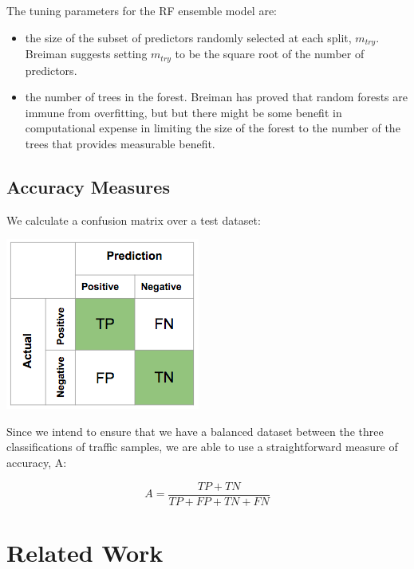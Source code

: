 \documentclass[conference]{IEEEtran}
\let\citep\cite
\let\tightlist\relax %
\begin{document}
The tuning parameters for the RF ensemble model are:

\begin{itemize}
\tightlist
\item
  the size of the subset of predictors randomly selected at each split,
  \(m_{try}\). Breiman suggests \citep{Breiman2001} setting \(m_{try}\)
  to be the square root of the number of predictors.
\item
  the number of trees in the forest. Breiman has proved that random
  forests are immune from overfitting, but but there might be some
  benefit in computational expense in limiting the size of the forest to
  the number of the trees that provides measurable benefit.
\end{itemize}

\subsection{Accuracy Measures}\label{sec:accuracy-measures}

\label{sec:accuracy}

We calculate a confusion matrix over a test dataset:

\begin{center}\includegraphics[width=0.5\linewidth]{confusion_matrix} \end{center}

Since we intend to ensure that we have a balanced dataset between the
three classifications of traffic samples, we are able to use a
straightforward measure of accuracy, A:

\[A = \frac{TP + TN}{TP + FP + TN + FN}\]

\section{Related Work}\label{sec:related-work}

\label{sec:related}
\end{document}
